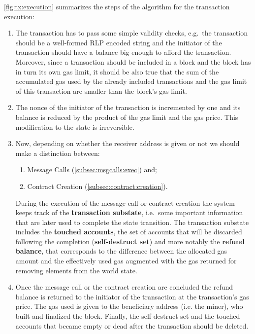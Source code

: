 \autoref{fig:tx:execution} summarizes the steps of the algorithm for the 
transaction execution:
\begin{enumerate}
	\item The transaction has to pass some simple validity checks, e.g.\ the
	transaction should be a well-formed RLP encoded string and the initiator
	of the transaction should have a balance big enough to afford the 
	transaction.
	Moreover, since a transaction should be included in a block and the block
	has in turn its own gas limit, it should be also true that the sum 
	of the accumulated gas used by the already included transactions and the gas
	limit of this transaction are smaller than the block's gas limit.
	\item The nonce of the initiator of the transaction is incremented by one and its balance is reduced by the product of the gas limit and the gas price. This modification to the state is irreversible.
	\item Now, depending on whether the receiver address is given or not
	we should make a distinction between:
	\begin{enumerate}[label=\alph*.]
		\item Message Calls (\autoref{subsec:msgcalls:exec}) and;
		\item Contract Creation (\autoref{subsec:contract:creation}).
	\end{enumerate}
	During the execution of the message call or contract creation the system
	keeps track of the \textbf{transaction substate}, i.e.\ some important
	information that are later used to complete the state transition.
	The transaction substate includes the \textbf{touched accounts}, the set of
	accounts that will be discarded following the completion 
	(\textbf{self-destruct set}) and more notably the
	\textbf{refund balance}, that corresponds
	to the difference between the allocated gas amount and the effectively used
	gas augmented with the gas returned for removing elements from the world
	state.
	\item Once the message call or the contract creation are concluded
	the refund balance is returned to the initiator of the transaction at the
	transaction's gas price.
	The gas used is given to the beneficiary address (i.e. the miner), who
	built and finalized the block. Finally, the self-destruct set and the
	touched accounts that became empty or dead after the transaction should
	be deleted. 
\end{enumerate}
 

